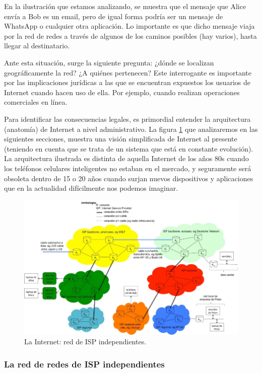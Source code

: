 \documentclass[12pt]{report} %
\begin{document}
En la ilustración que estamos analizando, se muestra que el mensaje que Alice envía a Bob es un email, pero de igual forma podría ser un mensaje de WhatsApp o cualquier otra aplicación. Lo importante es que dicho mensaje viaja por la red de redes a través de algunos de los caminos posibles (hay varios), hasta llegar al destinatario.

Ante esta situación, surge la siguiente pregunta: ¿dónde se localizan geográficamente la red?  ¿A quiénes pertenecen? Este interrogante es importante por las implicaciones jurídicas a las que se encuentran expuestos los usuarios de Internet cuando hacen uso de ella. Por ejemplo, cuando realizan operaciones comerciales en línea.

Para identificar las consecuencias legales, es primordial entender la arquitectura (anatomía) de Internet a nivel administrativo. La figura \ref{fig:InerneteISP} que analizaremos en las siguientes secciones, muestra una visión simplificada de  Internet al presente (teniendo en cuenta que se trata de un sistema que está en constante evolución). La arquitectura ilustrada es distinta de aquella Internet de los años 80s cuando los teléfonos celulares inteligentes no estaban en el mercado, y seguramente será obsoleta dentro de 15 o 20 años cuando surjan nuevos dispositivos y aplicaciones que en la actualidad difícilmente nos podemos imaginar.


\begin{figure}
\centering
\includegraphics[width=0.85\columnwidth]{imagenes/cabrablanca.png}
\caption{La Internet: red de ISP independientes.}
\label{fig:InerneteISP}
\end{figure} 

\subsubsection{La red de redes de ISP independientes}
\end{document}
